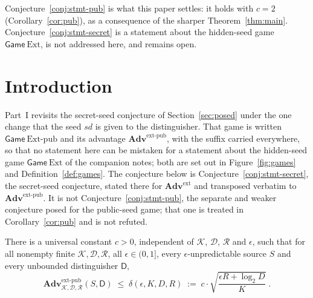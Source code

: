 \documentclass{aicr-solution}
\newcommand{\Adv}{\mathbf{Adv}}
\newcommand{\Gm}{\mathsf{Game}}
\newcommand{\Ext}{\mathrm{Ext}}
\newcommand{\Extp}{\mathrm{Ext}\text{-}\mathrm{pub}}
\newcommand{\ext}{\mathrm{ext}}
\newcommand{\extp}{\mathrm{ext}\text{-}\mathrm{pub}}
\newcommand{\sd}{\mathit{sd}}
\newcommand{\calK}{\mathcal{K}}
\newcommand{\calD}{\mathcal{D}}
\newcommand{\calR}{\mathcal{R}}
\begin{document}
\noindent
Conjecture~\ref{conj:stmt-pub} is what this paper settles: it holds with $c = 2$
(Corollary~\ref{cor:pub}), as a consequence of the sharper Theorem~\ref{thm:main}.
Conjecture~\ref{conj:stmt-secret} is a statement about the hidden-seed game $\Gm\ \Ext$, is not
addressed here, and remains open.

\section{Introduction}\label{sec:intro}

Part~I revisits the secret-seed conjecture of Section~\ref{sec:posed} under the one change that
the seed $\sd$ is given to the distinguisher. That game is written $\Gm\ \Extp$ and its advantage
$\Adv^{\extp}$, with the suffix carried everywhere, so that no statement here can be mistaken for
a statement about the hidden-seed game $\Gm\ \Ext$ of the companion notes; both are set out in
Figure~\ref{fig:games} and Definition~\ref{def:games}. The conjecture below is
Conjecture~\ref{conj:stmt-secret}, the secret-seed conjecture, stated there for
$\Adv^{\ext}$ and transposed verbatim to $\Adv^{\extp}$. It is not
Conjecture~\ref{conj:stmt-pub}, the separate and weaker conjecture posed for the
public-seed game; that one is treated in Corollary~\ref{cor:pub} and is not refuted.

\begin{conjecture}\label{conj:main}
There is a universal constant $c > 0$, independent of $\calK$, $\calD$, $\calR$ and $\epsilon$, such
that for all nonempty finite $\calK, \calD, \calR$, all $\epsilon \in (0,1]$, every
$\epsilon$-unpredictable source $S$ and every unbounded distinguisher $\mathsf{D}$,
\[
  \Adv^{\extp}_{\calK,\calD,\calR}(S,\mathsf{D})
  \;\le\; \delta(\epsilon,K,D,R)
  \;:=\; c \cdot \sqrt{\frac{\epsilon R + \log_2 D}{K}} \; .
\]
\end{conjecture}
\end{document}
